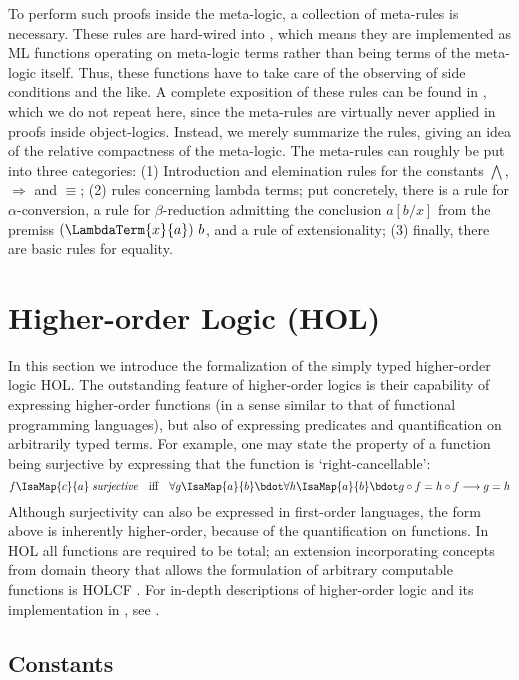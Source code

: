 To perform such proofs inside the meta-logic, a collection of meta-rules is
necessary. These rules are hard-wired into \Isabelle, which means they are
implemented as ML functions operating on meta-logic terms rather than being
terms of the meta-logic itself. Thus, these functions have to take care of the
observing of side conditions and the like. A complete exposition of these rules
can be found in \cite[Section 2.4]{Paulson89}, which we do not repeat here,
since the meta-rules are virtually never applied in proofs inside object-logics.
Instead, we merely summarize the rules, giving an idea of the relative
compactness of the meta-logic. The meta-rules can roughly be put into three
categories: (1) Introduction and elemination rules for the constants $\bigwedge$, $\Longrightarrow$
and $\equiv$; (2) rules concerning lambda terms; put concretely, there is a rule for
$\alpha$-conversion, a rule for $\beta$-reduction admitting the conclusion $a[b/x]$ from
the premiss $(\LambdaTerm{x}{a})\ b$, and a rule of extensionality; (3) finally,
there are basic rules for equality.


\section{Higher-order Logic (HOL)}
\label{sec:higher-order-logic}

In this section we introduce the formalization of the simply typed higher-order
logic HOL. The outstanding feature of higher-order logics is their
capability of expressing higher-order functions (in a sense similar to that of
functional programming languages), but also of expressing predicates and
quantification on arbitrarily typed terms. For example, one may state the
property of a function being surjective by expressing that the function is
`right-cancellable':
\[
f\IsaMap{c}{a}\; \textit{surjective} \quad\text{iff}\quad \forall g\IsaMap{a}{b}\bdot
\forall h\IsaMap{a}{b}\bdot g \circ f = h \circ f \longrightarrow g = h
\]
Although surjectivity can also be expressed in first-order languages, the form
above is inherently higher-order, because of the quantification on
functions. In HOL all functions are required to be total; an extension
incorporating concepts from domain theory that allows the formulation of
arbitrary computable functions is HOLCF \cite{MuellerNipkowOheimbSlotosch}. 
For in-depth descriptions of higher-order logic and its implementation in
\Isabelle, see \cite{Andrews00,IsabelleHOL}.


\subsection{Constants}
\label{sec:hol-constants}

